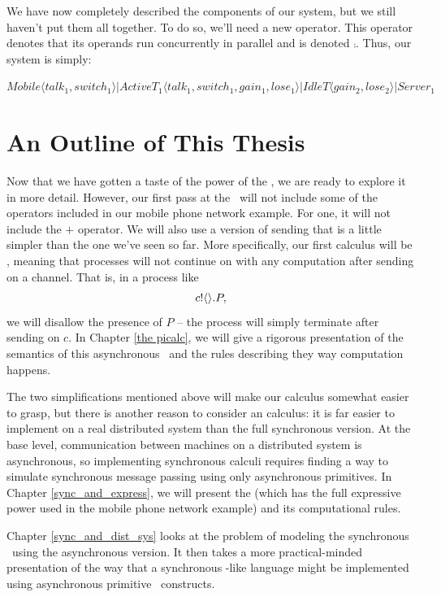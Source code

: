 We have now completely described the components of our system, but we still haven't put them all together.  
To do so, we'll need a new operator.  
This operator denotes that its operands run concurrently in parallel and is denoted $\comp$.  
Thus, our system is simply:
\begin{center}
	\small{$\textstyle Mobile\langle talk_1,switch_1\rangle|ActiveT_1\langle talk_1,switch_1,gain_1,lose_1\rangle|IdleT\langle gain_2,lose_2\rangle|Server_1$}
\end{center}

\section{An Outline of This Thesis}	
	Now that we have gotten a taste of the power of the \picalc, we are ready to explore it in more detail.  
However, our first pass at the \picalc\ will not include some of the operators included in our mobile phone network example.  
For one, it will not include the $+$ operator.  
We will also use a version of sending that is a little simpler than the one we've seen so far.  
More specifically, our first calculus will be , meaning that processes will not continue on with any computation after sending on a channel.  
That is, in a process like
\[
	{c}!\langle{}\rangle.P,
\]
we will disallow the presence of $P$ -- the process will simply terminate after sending on $c$.  
In Chapter \ref{the picalc}, we will give a rigorous presentation of the semantics of this asynchronous \picalc\ and the rules describing they way computation happens.

The two simplifications mentioned above will make our calculus somewhat easier to grasp, but there is another reason to consider an  calculus: it is far easier to implement on a real distributed system than the full synchronous version.  
At the base level, communication between machines on a distributed system is asynchronous, so implementing synchronous calculi requires finding a way to simulate synchronous message passing using only asynchronous primitives.  
In Chapter \ref{sync_and_express}, we will present the  \picalc (which has the full expressive power used in the mobile phone network example) and its computational rules.

Chapter \ref{sync_and_dist_sys} looks at the problem of modeling the synchronous \picalc\ using the asynchronous version.  It then takes a more practical-minded presentation of the way that a synchronous \picalc-like language might be implemented using asynchronous primitive \picalc\ constructs.